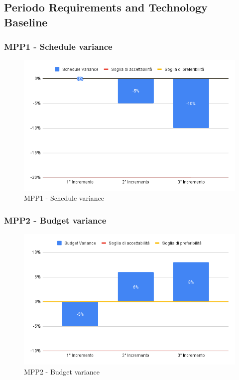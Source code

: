 \subsection{Periodo Requirements and Technology Baseline}
\subsubsection{MPP1 - Schedule variance}

\begin{figure}[H]
	\centering
	\includegraphics[scale = 0.6]{sezioni/Images/ScheduleVariance.png}
	\caption{MPP1 - Schedule variance}
\end{figure}

\subsubsection{MPP2 - Budget variance}

\begin{figure}[H]
	\centering
	\includegraphics[scale = 0.6]{sezioni/Images/BudgetVariance.png}
	\caption{MPP2 - Budget variance}
\end{figure}

